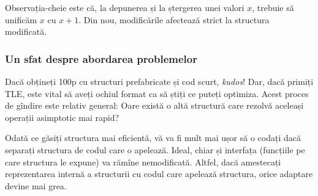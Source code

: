 \documentclass[../main.tex]{subfiles}
\begin{document}
Observația-cheie este că, la depunerea și la ștergerea unei valori $x$, trebuie să unificăm $x$ cu $x + 1$. Din nou, modificările afectează strict la structura modificată.

\subsubsection*{Un sfat despre abordarea problemelor}

Dacă obțineți 100p cu structuri prefabricate și cod scurt, \textit{kudos}! Dar, dacă primiți TLE, este vital să aveți ochiul format ca să știți ce puteți optimiza. Acest proces de gîndire este relativ general: Oare există o altă structură care rezolvă aceleași operații asimptotic mai rapid?

Odată ce găsiți structura mai eficientă, vă va fi mult mai ușor să o codați dacă separați structura de codul care o apelează. Ideal, chiar și interfața (funcțiile pe care structura le expune) va rămîne nemodificată. Altfel, dacă amestecați reprezentarea internă a structurii cu codul care apelează structura, orice adaptare devine mai grea.
\end{document}

